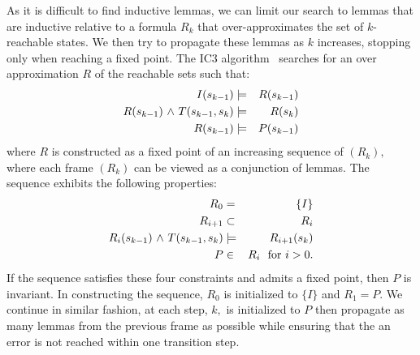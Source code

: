As it is difficult to find inductive lemmas, we can limit our search
to lemmas that are inductive relative to a formula $R_k$ that
over-approximates the set of $k$-reachable states. We then try to
propagate these lemmas as $k$ increases, stopping only when reaching a
fixed point. The IC3 algorithm~\cite{Somenzi-FMCAD11,
  BradleyCAV12,bradley2012understanding} searches for an
over approximation $R$ of the reachable sets such that:
\begin{eqnarray*} 
I(s_{k-1})  & \models & R(s_{k-1}) \\
R(s_{k-1})  {\ \wedge \ }  T(s_{k-1},s_k) &\models & R(s_k)  \\
R(s_{k-1})  & \models & P(s_{k-1})
\end{eqnarray*}
where $R$  is constructed as a fixed point of an increasing sequence
of $(R_k),$ where each frame $(R_k)$ can be viewed as a conjunction of
lemmas. The sequence exhibits the following properties: 
\begin{eqnarray*}
R_0 & = & \{ I \} \\
R_{i+1} & \subset & R_i \\
R_i(s_{k-1}) {\ \wedge \ }  T(s_{k-1},s_k) &\models & R_{i+1}(s_k)   \\
P &\in& R_i \ \ \mbox{for} \ i > 0. 
\end{eqnarray*}
 If the sequence satisfies these four constraints and admits a fixed
 point, then $P$ is invariant.   In constructing the sequence, $R_0$
 is initialized to $\{ I \}$ and  $R_1 = P.$  We continue in similar
 fashion, at  each step, $k,$ is initialized to $P$ then propagate as
 many lemmas from the previous frame as possible while ensuring that
 the an error is not reached within one transition step. 

